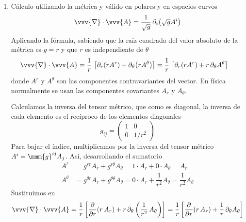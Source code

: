 \begin{enumerate}
  Sustituimos estos resultados en los dos sumandos de la divergencia
  \eqref{eq:R2-divergencia-sumandos}
  \[
    \vvv{\nabla}\cdot\vvv{A}
    = \dfrac{\partial A_r}{\partial r}
    + \dfrac{1}{r} A_r
    + \dfrac{1}{r} \dfrac{\partial A_\theta}{\partial\theta}
  \]
  
  Agrupando términos obtenemos la divergencia en polares
  \begin{equation}\label{eq:R2-divergencia-polares}
    \vvv{\nabla}\cdot\vvv{A}
    = \dfrac{1}{r}\dfrac{\partial}{\partial r}(rA_r)
    + \dfrac{1}{r}\dfrac{\partial A_\theta}{\partial\theta}
  \end{equation}

\item Cálculo utilizando la métrica y válido en polares y en espacios curvos
  \begin{equation}
    \vvv{\nabla}\cdot\vvv{A}
    = \dfrac{1}{\sqrt{g}}\,\partial_i\big(\sqrt{g} A^i\big)
  \end{equation}
  Aplicando la fórmula, sabiendo que la raíz cuadrada del valor absoluto de la métrica
  es $g=r$ y que $r$ es independiente de $\theta$
  \begin{align*}
    \vvv{\nabla}\cdot\vvv{A}
    &=
      \dfrac{1}{r}\,\left[%
      \partial_r\!\left(rA^r\right) + \partial_\theta\!\left(rA^\theta\right)
      \right]
    =
      \dfrac{1}{r}\,\left[%
      \partial_r\!\left(rA^r\right) + r\,\partial_\theta A^\theta
      \right]      
  \end{align*}
  donde $A^r$ y $A^\theta$ son las componentes contravariantes del vector. En física
  normalmente se usan las componentes covariantes $A_r$ y $A_\theta$.

  Calculamos la inversa del tensor métrico, que como es diagonal, la inversa de cada
  elemento es el recíproco de los elementos diagonales
  \begin{equation}
    g_{ij} = \begin{pmatrix}1 & 0\\ 0 & 1/r^2 \end{pmatrix}
  \end{equation}
  Para bajar el índice, multiplicamos por la inversa del  tensor métrico $A^i = \mmm{g}^{ij}
  A_j$.
  Así, desarrollando el sumatorio
  \begin{align*}
    A^r
    &=
      g^{rr}A_r + g^{r\theta}A_\theta = 1\cdot A_r + 0\cdot A_\theta = A_r\\
    A^\theta
    &=
      g^{\theta r}A_r + g^{\theta\theta}A_\theta = 0\cdot A_r + \dfrac{1}{r^2} A_\theta
      = \dfrac{1}{r^2}A_\theta
  \end{align*}
  Sustituimos en
  \begin{align*}
    \vvv{\nabla}\cdot\vvv{A}
    = \dfrac{1}{r}\left[%
    \dfrac{\partial}{\partial r}\!\left(r\,A_r\right)
    + r\, \partial_\theta\left(\dfrac{1}{r^2}\, A_\theta\right)
    \right]
    = \dfrac{1}{r}\left[%
    \dfrac{\partial}{\partial r}\!\left(r\,A_r\right)
    + \dfrac{1}{r}\, \partial_\theta A_\theta
    \right]
  \end{align*}
  
\end{enumerate}


